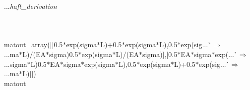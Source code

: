 {{\begin{tabbing}
...{}{\it{haft\_derivation
}}\\
\hspace{20pt}{\it{\#
}}\\
\\
\hspace{20pt}{\it{\#
}}\\
\hspace{20pt}matout=array({[}{[}0.5$\ast$exp(sigma$\ast$L)+0.5$\ast$exp(\dash{}sigma$\ast$L),0.5$\ast$exp(sig{}...\`$\Rightarrow$\\
...{}ma$\ast$L)/(EA$\ast$sigma)\dash{}0.5$\ast$exp(\dash{}sigma$\ast$L)/(EA$\ast$sigma){]},{[}0.5$\ast$EA$\ast$sigma$\ast$exp({}...\`$\Rightarrow$\\
...{}sigma$\ast$L)\dash{}0.5$\ast$EA$\ast$sigma$\ast$exp(\dash{}sigma$\ast$L),0.5$\ast$exp(sigma$\ast$L)+0.5$\ast$exp(\dash{}sig{}...\`$\Rightarrow$\\
...{}ma$\ast$L){]}{]})
\\
\hspace{5pt}matout
\\

\end{tabbing}}}
